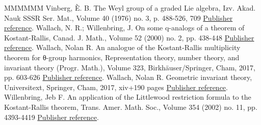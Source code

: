 \begin{thebibliography}{MMMMMM}
 Vinberg, È. B. The Weyl group of a graded Lie algebra, Izv. Akad. Nauk SSSR Ser. Mat., Volume 40 (1976) no. 3, p. 488-526, 709 \href{https://alco.centre-mersenne.org/articles/10.5802/alco.391/#Vinberg1976}{Publisher reference}.
 Wallach, N. R.; Willenbring, J. On some q-analogs of a theorem of Kostant-Rallis, Canad. J. Math., Volume 52 (2000) no. 2, pp. 438-448 \href{https://alco.centre-mersenne.org/articles/10.5802/alco.391/#WallachWillenbring2000}{Publisher reference}.
 Wallach, Nolan R. An analogue of the Kostant-Rallis multiplicity theorem for θ-group harmonics, Representation theory, number theory, and invariant theory (Progr. Math.), Volume 323, Birkhäuser/Springer, Cham, 2017, pp. 603-626 \href{https://alco.centre-mersenne.org/articles/10.5802/alco.391/#Wallach2017}{Publisher reference}.
 Wallach, Nolan R. Geometric invariant theory, Universitext, Springer, Cham, 2017, xiv+190 pages \href{https://alco.centre-mersenne.org/articles/10.5802/alco.391/#Wallach2017-2}{Publisher reference}.
 Willenbring, Jeb F. An application of the Littlewood restriction formula to the Kostant-Rallis theorem, Trans. Amer. Math. Soc., Volume 354 (2002) no. 11, pp. 4393-4419 \href{https://alco.centre-mersenne.org/articles/10.5802/alco.391/#Willenbring2002}{Publisher reference}.
\end{thebibliography}
